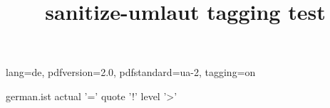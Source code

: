 \ifdefined\Uchar\RequirePackage{luatagging}\fi
\DocumentMetadata
  {
    lang=de,
    pdfversion=2.0,
    pdfstandard=ua-2,
    tagging=on
  }
\begin{filecontents}{german.ist}
actual '=' %
quote '!' %
level '>' %
\end{filecontents}
\documentclass[a4paper,12pt]{article}
\ifdefined\Uchar
\else
  \usepackage[T1]{fontenc}
\fi
\usepackage[ngerman]{babel}
\usepackage{makeidx}
\usepackage{sanitize-umlaut}
\usepackage[hyperindex,colorlinks]{hyperref}
\makeindex

\title{sanitize-umlaut tagging test}


\section{Basic Example}
Test äöüÄÖÜß.
\index{Aber} \index{Arg} \index{Ärger}
\index{Ofen} \index{Ö - wie schön} \index{oberhalb}
\index{Ufer} \index{Übermaß}
\index{Latex=\LaTeX} \index{Ärger>Index}
Test äöüÄÖÜß.
\printindex
